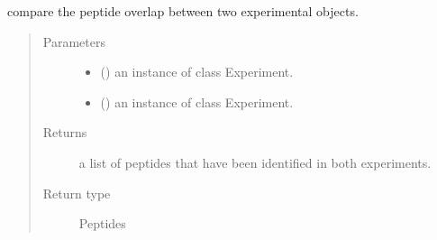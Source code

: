 \documentclass[letterpaper,10pt,english]{sphinxmanual}
\begin{document}
\begin{fulllineitems}
\label{\detokenize{IPTK.Analysis:IPTK.Analysis.AnalysisFunction.get_binnary_peptide_overlap}}
compare the peptide overlap between two experimental objects.
\begin{quote}\begin{description}
\item[{Parameters}] \leavevmode\begin{itemize}
\item {} 
 ({\hyperref[\detokenize{IPTK.Classes:IPTK.Classes.Experiment.Experiment}]{}}) \textendash{} an instance of class Experiment.

\item {} 
 ({\hyperref[\detokenize{IPTK.Classes:IPTK.Classes.Experiment.Experiment}]{}}) \textendash{} an instance of class Experiment.

\end{itemize}

\item[{Returns}] \leavevmode
a list of peptides that have been identified in both experiments.

\item[{Return type}] \leavevmode
Peptides

\end{description}\end{quote}

\end{fulllineitems}

\end{document}
